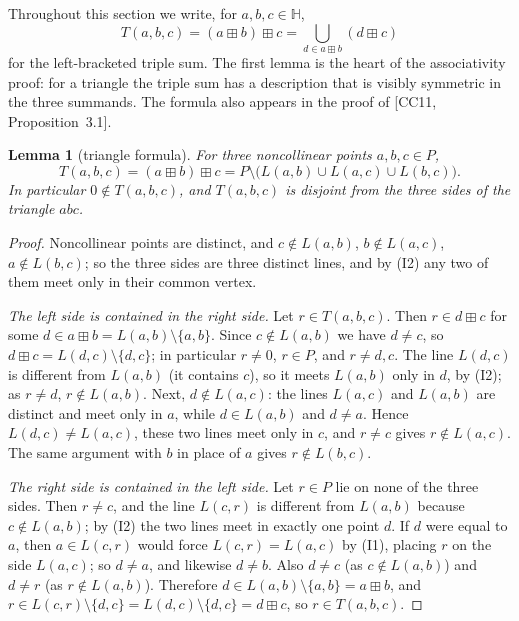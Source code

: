 \documentclass[12pt]{article}
\theoremstyle{plain}
\newtheorem{lemma}[theorem]{Lemma}
\theoremstyle{definition}
\newcommand{\Hh}{\mathbb{H}}
\newcommand{\bp}{\boxplus}
\begin{document}
Throughout this section we write, for $a,b,c\in\Hh$,
\[
 T(a,b,c)=(a\bp b)\bp c=\bigcup_{d\in a\bp b}(d\bp c)
\]
for the left-bracketed triple sum.  The first lemma is the heart of the
associativity proof: for a triangle the triple sum has a description
that is visibly symmetric in the three summands.  The formula also
appears in the proof of [CC11, Proposition~3.1].

\begin{lemma}[triangle formula]\label{lem:triangle}
For three noncollinear points $a,b,c\in P$,
\begin{equation}\label{eq:triangle}
 T(a,b,c)=(a\bp b)\bp c
 =P\setminus\bigl(L(a,b)\cup L(a,c)\cup L(b,c)\bigr).
\end{equation}
In particular $0\notin T(a,b,c)$, and $T(a,b,c)$ is disjoint from the
three sides of the triangle $abc$.
\end{lemma}
\begin{proof}
Noncollinear points are distinct, and $c\notin L(a,b)$,
$b\notin L(a,c)$, $a\notin L(b,c)$; so the three sides are three distinct
lines, and by (I2) any two of them meet only in their common vertex.

\emph{The left side is contained in the right side.}
Let $r\in T(a,b,c)$.  Then $r\in d\bp c$ for some
$d\in a\bp b=L(a,b)\setminus\{a,b\}$.  Since $c\notin L(a,b)$ we have
$d\neq c$, so $d\bp c=L(d,c)\setminus\{d,c\}$; in particular $r\neq0$,
$r\in P$, and $r\neq d,c$.  The line $L(d,c)$ is different from
$L(a,b)$ (it contains $c$), so it meets $L(a,b)$ only in $d$, by (I2);
as $r\neq d$, $r\notin L(a,b)$.  Next, $d\notin L(a,c)$: the lines
$L(a,c)$ and $L(a,b)$ are distinct and meet only in $a$, while
$d\in L(a,b)$ and $d\neq a$.  Hence $L(d,c)\neq L(a,c)$, these two
lines meet only in $c$, and $r\neq c$ gives $r\notin L(a,c)$.  The same
argument with $b$ in place of $a$ gives $r\notin L(b,c)$.

\emph{The right side is contained in the left side.}
Let $r\in P$ lie on none of the three sides.  Then $r\neq c$, and the
line $L(c,r)$ is different from $L(a,b)$ because $c\notin L(a,b)$; by
(I2) the two lines meet in exactly one point $d$.  If $d$ were equal to
$a$, then $a\in L(c,r)$ would force $L(c,r)=L(a,c)$ by (I1), placing
$r$ on the side $L(a,c)$; so $d\neq a$, and likewise $d\neq b$.  Also
$d\neq c$ (as $c\notin L(a,b)$) and $d\neq r$ (as $r\notin L(a,b)$).
Therefore $d\in L(a,b)\setminus\{a,b\}=a\bp b$, and
$r\in L(c,r)\setminus\{d,c\}=L(d,c)\setminus\{d,c\}=d\bp c$, so
$r\in T(a,b,c)$.
\end{proof}
\end{document}
